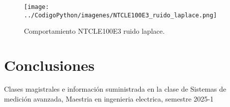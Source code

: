 \documentclass[conference]{IEEEtran}
\begin{document}
\begin{figure}[h!]
	\centering
	\texttt{[image: ../CodigoPython/imagenes/NTCLE100E3\_ruido\_laplace.png]}
	\caption{Comportamiento NTCLE100E3 ruido laplace.}
	\label{fig:NTCLE100E3_ruido_laplace}
\end{figure}

\section{Conclusiones}


\begin{thebibliography}{00}

\item Clases magistrales e información suministrada en la clase de Sistemas de medición avanzada, Maestria en ingenieria electrica, semestre 2025-1

\end{thebibliography}
\end{document}
